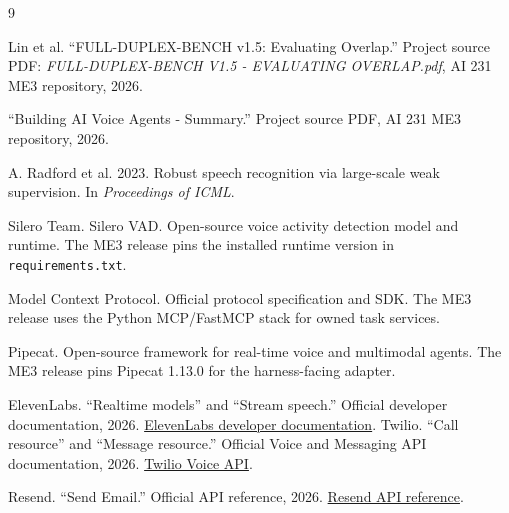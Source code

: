 \documentclass[sigconf,nonacm]{acmart}
\begin{document}
\begin{thebibliography}{9}

Lin et al. ``FULL-DUPLEX-BENCH v1.5: Evaluating Overlap.''
Project source PDF: \textit{FULL-DUPLEX-BENCH V1.5 - EVALUATING OVERLAP.pdf},
AI 231 ME3 repository, 2026.

``Building AI Voice Agents - Summary.'' Project source PDF, AI 231 ME3
repository, 2026.

A. Radford et al. 2023. Robust speech recognition via large-scale weak
supervision. In \textit{Proceedings of ICML}.

Silero Team. Silero VAD. Open-source voice activity detection model and
runtime. The ME3 release pins the installed runtime version in
\texttt{requirements.txt}.

Model Context Protocol. Official protocol specification and SDK. The ME3
release uses the Python MCP/FastMCP stack for owned task services.

Pipecat. Open-source framework for real-time voice and multimodal agents. The
ME3 release pins Pipecat 1.13.0 for the harness-facing adapter.

ElevenLabs. ``Realtime models'' and ``Stream speech.'' Official developer
documentation, 2026. \href{https://elevenlabs.io/docs/eleven-agents/customization/realtime-models}{ElevenLabs developer documentation}.
Twilio. ``Call resource'' and ``Message resource.'' Official Voice and
Messaging API documentation, 2026.
\href{https://www.twilio.com/docs/voice/api/call-resource}{Twilio Voice API}.

Resend. ``Send Email.'' Official API reference, 2026.
\href{https://resend.com/docs/api-reference/emails/send-email}{Resend API reference}.

\end{thebibliography}
\end{document}
